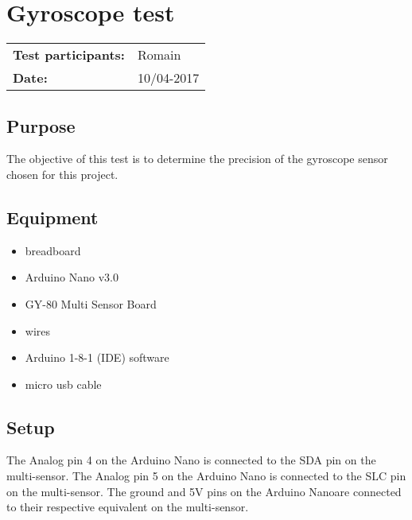 		\chapter{Gyroscope test}

\begin{table}[!h]
	\begin{tabular}{l l}
		\textbf{Test participants:} & Romain   \\
		\textbf{Date:}  & 10/04-2017
	\end{tabular}
\end{table}

	\section{Purpose}

The objective of this test is to determine the precision of the gyroscope sensor chosen for this project.

	\section{Equipment}
	
\begin{itemize}
	\item breadboard
	\item Arduino Nano v3.0
	\item GY-80  Multi Sensor Board
	\item wires
	\item Arduino 1-8-1 (IDE) software
	\item micro usb cable
\end{itemize}

	\section{Setup}

The Analog pin 4 on the Arduino Nano is connected to the SDA pin on the multi-sensor. The Analog pin 5 on the Arduino Nano is connected to the SLC pin on the multi-sensor. The ground and 5V pins on the Arduino Nanoare connected to their respective equivalent on the multi-sensor.

